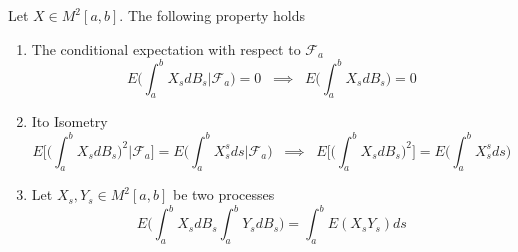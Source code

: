 \begin{theorem}
    Let $X \in M^2[a,b]$. The following property holds
    \begin{enumerate}
        \item The conditional expectation with respect to $\mathcal{F}_a$
        \begin{equation}
            E\Bigg( \int_a^b X_s dB_s \Big\vert \mathcal{F}_a \Bigg) = 0 \;\; \implies \;\; E\Bigg( \int_a^b X_s d B_s \Bigg) = 0
        \end{equation}

        \item Ito Isometry
        \begin{equation}
            E\Bigg[ \Bigg( \int_a^b X_s dB_s \Bigg)^2 \Big\vert \mathcal{F}_a \Bigg] = E\Bigg( \int_a^b X_s^s ds \Big\vert \mathcal{F}_a \Bigg) \;\; \implies \;\; E\Bigg[ \Bigg( \int_a^b X_s dB_s \Bigg)^2 \Bigg] = E\Bigg( \int_a^b X_s^s ds \Bigg)
        \end{equation}
        \item Let $X_s,Y_s \in M^2[a,b]$ be two processes 
        \begin{equation}
            E\Bigg( \int_a^b X_s dB_s \int_a^b Y_s dB_s \Bigg) = \int_a^b E( X_s Y_s) ds 
        \end{equation}
    \end{enumerate}
\end{theorem}
